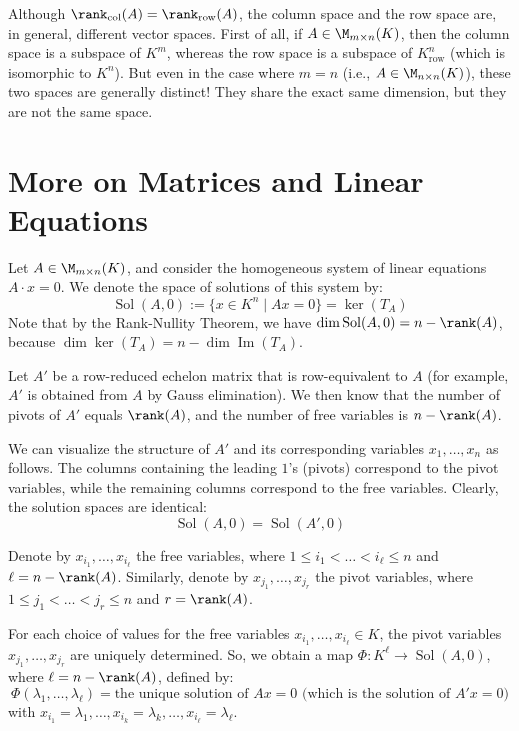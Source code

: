 \begin{importantremark}
Although $\rank_{\text{col}}(A) = \rank_{\text{row}}(A)$, the column space and the row space are, in general, different vector spaces. First of all, if $A \in \M_{m \times n}(K)$, then the column space is a subspace of $K^m$, whereas the row space is a subspace of $K_{\text{row}}^n$ (which is isomorphic to $K^n$). But even in the case where $m = n$ (i.e., $A \in \M_{n \times n}(K)$), these two spaces are generally distinct! They share the exact same dimension, but they are not the same space.
\end{importantremark}

\section{More on Matrices and Linear Equations}

Let $A \in \M_{m \times n}(K)$, and consider the homogeneous system of linear equations $A \cdot x = 0$. We denote the space of solutions of this system by:
\begin{equation*}
    \operatorname{Sol}(A, 0) := \{x \in K^n \mid A x = 0\} = \ker(T_A)
\end{equation*}
Note that by the Rank-Nullity Theorem, we have $\dim \operatorname{Sol}(A, 0) = n - \rank(A)$, because $\dim \ker(T_A) = n - \dim \operatorname{Im}(T_A)$.

Let $A'$ be a row-reduced echelon matrix that is row-equivalent to $A$ (for example, $A'$ is obtained from $A$ by Gauss elimination). We then know that the number of pivots of $A'$ equals $\rank(A)$, and the number of free variables is $n - \rank(A)$.

We can visualize the structure of $A'$ and its corresponding variables $x_1, \dots, x_n$ as follows. The columns containing the leading $1$'s (pivots) correspond to the pivot variables, while the remaining columns correspond to the free variables. Clearly, the solution spaces are identical:
\begin{equation*}
    \operatorname{Sol}(A, 0) = \operatorname{Sol}(A', 0)
\end{equation*}

Denote by $x_{i_1}, \dots, x_{i_\ell}$ the free variables, where $1 \le i_1 < \dots < i_\ell \le n$ and $\ell = n - \rank(A)$. Similarly, denote by $x_{j_1}, \dots, x_{j_r}$ the pivot variables, where $1 \le j_1 < \dots < j_r \le n$ and $r = \rank(A)$.

For each choice of values for the free variables $x_{i_1}, \dots, x_{i_\ell} \in K$, the pivot variables $x_{j_1}, \dots, x_{j_r}$ are uniquely determined. So, we obtain a map $\Phi: K^\ell \to \operatorname{Sol}(A, 0)$, where $\ell = n - \rank(A)$, defined by:
\begin{equation*}
    \Phi(\lambda_1, \dots, \lambda_\ell) = \text{the unique solution of } Ax = 0 \text{ (which is the solution of } A'x = 0 \text{)}
\end{equation*}
with $x_{i_1} = \lambda_1, \dots, x_{i_k} = \lambda_k, \dots, x_{i_\ell} = \lambda_\ell$.

